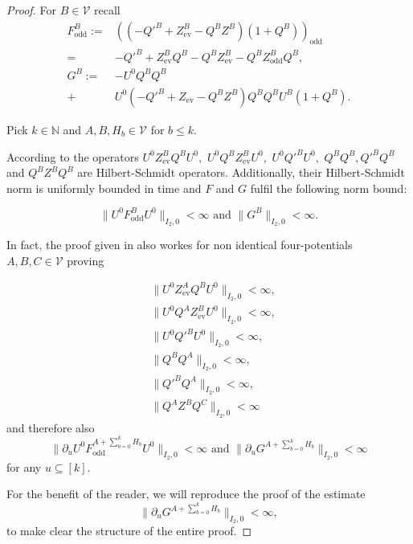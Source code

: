 \documentclass[b5paper,draft,openbib,12pt]{memoir}
\DeclareMathOperator{\ev}{ev}
\DeclareMathOperator{\odd}{odd}
\begin{document}
\begin{proof}
For \(B\in\mathcal{V}\) recall 
\begin{align}
F^B_{\odd}:=& ((-{Q'}^B+Z^B_{\mathrm{ev}}-Q^BZ^B)(1+Q^B))_{\odd}\\\label{Fodd sum}
=&-{Q'}^{B}+Z_{\ev}^B Q^B -Q^BZ^B_{\ev} - Q^B Z_{\odd}^B Q^B,\\
G^B:=&- U^0Q^BQ^B \\
+& U^0(-{Q'}^B+Z_{\mathrm{ev}}-Q^B Z^B)Q^B Q^B U^B (1+Q^B).
\end{align}

Pick \(k\in\mathbb{N}\)
and  \(A,B, H_b\in\mathcal{V}\) for \(b\le k\).

According to \cite[lemma 3.7]{ivp0} the operators 
\(U^0Z_{\ev}^B Q^B U^0,\) \(U^0 Q^B Z_{\ev}^B U^0,\) 
\(U^0 {Q'}^{B}U^0,\) \(Q^B Q^B, {Q'}^B Q^B\) and 
\(Q^B Z^B Q^B\) are Hilbert-Schmidt operators.
Additionally, their  Hilbert-Schmidt norm is uniformly
bounded in time and \(F\) and \(G\) fulfil the following 
norm bound:

\begin{equation}
\|U^0 F_{\odd}^BU^0\|_{I_2,0}<\infty 
\text{ and } \|G^B\|_{I_2,0}<\infty.
\end{equation}

In fact, the proof given in \cite{ivp0} also workes
for non identical four-potentials \(A,B,C\in\mathcal{V}\)
proving

\begin{align}
&\| U^0Z_{\ev}^A Q^B U^0\|_{I_2,0}<\infty,\\
&\|U^0 Q^A Z_{\ev}^B U^0\|_{I_2,0}<\infty,\\ 
&\|U^0 {Q'}^{B}U^0\|_{I_2,0}<\infty,\\
&\|Q^B Q^A\|_{I_2,0}<\infty,\\ 
&\|{Q'}^B Q^A\|_{I_2,0}<\infty,\\ 
&\|Q^A Z^B Q^C\|_{I_2,0}<\infty
\end{align}
and therefore also 
\begin{equation}
\|\partial_u U^0 F_{\odd}^{A+\sum_{b=0}^k H_b}U^0\|_{I_2,0}<\infty 
\text{ and } \|\partial_u G^{A+\sum_{b=0}^k H_b}\|_{I_2,0}<\infty
\end{equation}
for any \(u\subseteq [k]\). 

For the benefit of the reader,
we will reproduce the proof of the estimate
\begin{equation}\label{HS property of G}
\|\partial_u G^{A+\sum_{b=0}^k H_b}\|_{I_2,0}<\infty,
\end{equation}
to make clear the structure of the entire proof.


\end{proof}
\end{document}

